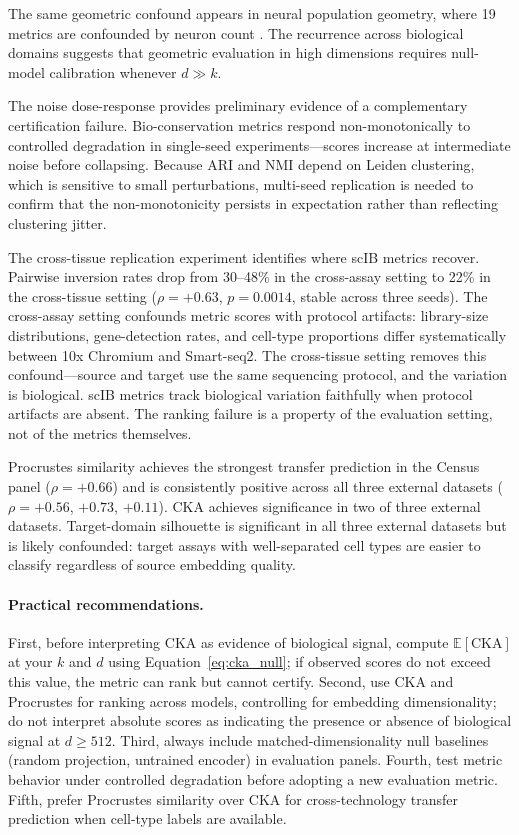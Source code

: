 \documentclass[11pt]{article}
\begin{document}
The same geometric confound appears in neural population geometry, where
19 metrics are confounded by neuron count \citep{tower2026bracket}. The
recurrence across biological domains suggests that geometric evaluation
in high dimensions requires null-model calibration whenever $d \gg k$.

The noise dose-response provides preliminary evidence of a
complementary certification failure. Bio-conservation metrics respond
non-monotonically to controlled degradation in single-seed
experiments---scores increase at intermediate noise before
collapsing. Because ARI and NMI depend on Leiden clustering, which is
sensitive to small perturbations, multi-seed replication is needed to
confirm that the non-monotonicity persists in expectation rather than
reflecting clustering jitter.

The cross-tissue replication experiment identifies where scIB metrics
recover. Pairwise inversion rates drop from 30--48\% in the cross-assay
setting to 22\% in the cross-tissue setting ($\rho = +0.63$,
$p = 0.0014$, stable across three seeds). The cross-assay setting
confounds metric scores with protocol artifacts: library-size
distributions, gene-detection rates, and cell-type proportions differ
systematically between 10x Chromium and Smart-seq2. The cross-tissue
setting removes this confound---source and target use the same
sequencing protocol, and the variation is biological. scIB metrics track
biological variation faithfully when protocol artifacts are absent. The
ranking failure is a property of the evaluation setting, not of the
metrics themselves.

Procrustes similarity achieves the strongest transfer prediction in the
Census panel ($\rho = +0.66$) and is consistently positive across all
three external datasets ($\rho = +0.56$, $+0.73$, $+0.11$). CKA
achieves significance in two of three external datasets. Target-domain
silhouette is significant in all three external datasets but is likely
confounded: target assays with well-separated cell types are easier to
classify regardless of source embedding quality.

\paragraph{Practical recommendations.} First, before interpreting CKA as
evidence of biological signal, compute $\mathbb{E}[\mathrm{CKA}]$ at
your $k$ and $d$ using Equation~\ref{eq:cka_null}; if observed scores do
not exceed this value, the metric can rank but cannot certify. Second,
use CKA and Procrustes for ranking across models, controlling for
embedding dimensionality; do not interpret absolute scores as indicating
the presence or absence of biological signal at $d \geq 512$. Third,
always include matched-dimensionality null baselines (random projection,
untrained encoder) in evaluation panels. Fourth, test metric behavior
under controlled degradation before adopting a new evaluation metric.
Fifth, prefer Procrustes similarity over CKA for cross-technology
transfer prediction when cell-type labels are available.
\end{document}
